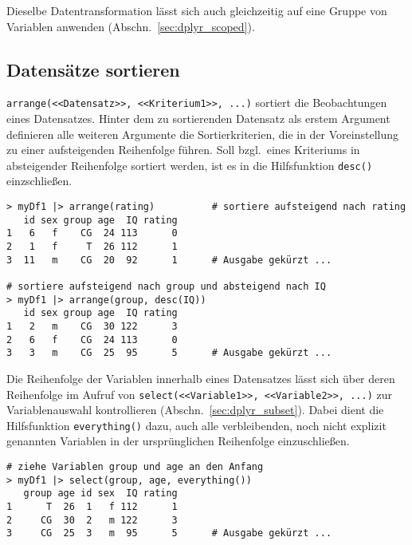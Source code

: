 Dieselbe Datentransformation lässt sich auch gleichzeitig auf eine Gruppe von Variablen anwenden (Abschn.\ \ref{sec:dplyr_scoped}). 

\subsection{Datensätze sortieren}
\label{sec:dplyr_sortDf}

\lstinline!arrange(<<Datensatz>>, <<Kriterium1>>, ...)! sortiert die Beobachtungen eines Datensatzes. Hinter dem zu sortierenden Datensatz als erstem Argument definieren alle weiteren Argumente die Sortierkriterien, die in der Voreinstellung zu einer aufsteigenden Reihenfolge führen. Soll bzgl.\ eines Kriteriums in absteigender Reihenfolge sortiert werden, ist es in die Hilfsfunktion \lstinline!desc()! einzschließen.
\begin{lstlisting}
> myDf1 |> arrange(rating)          # sortiere aufsteigend nach rating
   id sex group age  IQ rating
1   6   f    CG  24 113      0
2   1   f     T  26 112      1
3  11   m    CG  20  92      1      # Ausgabe gekürzt ...

# sortiere aufsteigend nach group und absteigend nach IQ
> myDf1 |> arrange(group, desc(IQ))
   id sex group age  IQ rating
1   2   m    CG  30 122      3
2   6   f    CG  24 113      0
3   3   m    CG  25  95      5      # Ausgabe gekürzt ...
\end{lstlisting}

Die Reihenfolge der Variablen innerhalb eines Datensatzes lässt sich über deren Reihenfolge im Aufruf von \lstinline!select(<<Variable1>>, <<Variable2>>, ...)! zur Variablenauswahl kontrollieren (Abschn.\ \ref{sec:dplyr_subset}). Dabei dient die Hilfsfunktion \lstinline!everything()! dazu, auch alle verbleibenden, noch nicht explizit genannten Variablen in der ursprünglichen Reihenfolge einzuschließen.
\begin{lstlisting}
# ziehe Variablen group und age an den Anfang
> myDf1 |> select(group, age, everything())
   group age id sex  IQ rating
1      T  26  1   f 112      1
2     CG  30  2   m 122      3
3     CG  25  3   m  95      5      # Ausgabe gekürzt ...
\end{lstlisting}

